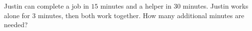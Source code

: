 Justin can complete a job in $15$ minutes and a helper in $30$ minutes. Justin works alone for $3$ minutes, then both work together. How many additional minutes are needed?

